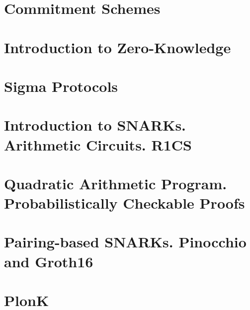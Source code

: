 \documentclass{zkdl-template-105x135}
\begin{document}
    

    \section{Commitment Schemes} \label{section:commitments}

     

    \section{Introduction to Zero-Knowledge} \label{section:intro-zk}

    

    \section{Sigma Protocols} \label{section:sigma}

    

    \section[Arithmetic Circuits. R1CS]{Introduction to SNARKs. Arithmetic Circuits. R1CS} \label{section:r1cs}

    \label{secation:circuits}

    \section[Quadratic Arithmetic Program]{Quadratic Arithmetic Program. Probabilistically Checkable Proofs} \label{section:qap}

    

    \section[Pairing-based SNARKs]{Pairing-based SNARKs. Pinocchio and Groth16} \label{section:groth16}

    

    \section{PlonK} \label{section:plonk}

    


    
    
    
    
\end{document}
